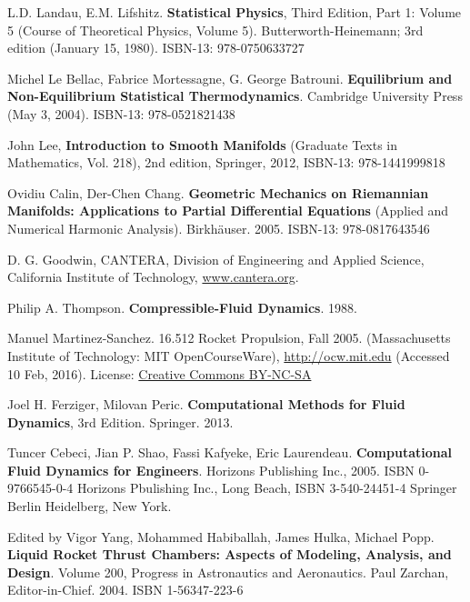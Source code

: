 \documentclass[10pt]{amsart}
\begin{document}
\begin{thebibliography}{9}
L.D. Landau, E.M. Lifshitz.  \textbf{Statistical Physics}, Third Edition, Part 1: Volume 5 (Course of Theoretical Physics, Volume 5). Butterworth-Heinemann; 3rd edition (January 15, 1980).  ISBN-13: 978-0750633727


Michel Le Bellac, Fabrice Mortessagne, G. George Batrouni.  \textbf{Equilibrium and Non-Equilibrium Statistical Thermodynamics}.  Cambridge University Press (May 3, 2004).  ISBN-13: 978-0521821438


John Lee, \textbf{Introduction to Smooth Manifolds} (Graduate Texts in Mathematics, Vol. 218), 2nd edition, Springer,  2012, ISBN-13: 978-1441999818

Ovidiu Calin, Der-Chen Chang. \textbf{Geometric Mechanics on Riemannian Manifolds: Applications to Partial Differential Equations} (Applied and Numerical Harmonic Analysis).  Birkh\"{a}user. 2005. ISBN-13: 978-0817643546




D. G. Goodwin, CANTERA, Division of Engineering and Applied Science, California Institute of Technology,
\url{www.cantera.org}.

Philip A. Thompson.  \textbf{Compressible-Fluid Dynamics}.  1988.

Manuel Martinez-Sanchez. 16.512 Rocket Propulsion, Fall 2005. (Massachusetts Institute of Technology: MIT OpenCourseWare), \href{http://ocw.mit.edu/courses/aeronautics-and-astronautics/16-512-rocket-propulsion-fall-2005}{http://ocw.mit.edu} (Accessed 10 Feb, 2016). License: \href{http://creativecommons.org/licenses/by-nc-sa/4.0/}{Creative Commons BY-NC-SA}


 Joel H. Ferziger, Milovan Peric.  \textbf{Computational Methods for Fluid Dynamics}, 3rd Edition.  Springer.  2013.  

 Tuncer Cebeci, Jian P. Shao, Fassi Kafyeke, Eric Laurendeau.  \textbf{Computational Fluid Dynamics for Engineers}.  Horizons Publishing Inc., 2005.  ISBN 0-9766545-0-4 Horizons Pbulishing Inc., Long Beach, ISBN 3-540-24451-4 Springer Berlin Heidelberg, New York.  
  


Edited by Vigor Yang, Mohammed Habiballah, James Hulka, Michael Popp.  \textbf{Liquid Rocket Thrust Chambers: Aspects of Modeling, Analysis, and Design}.  Volume 200, Progress in Astronautics and Aeronautics.  Paul Zarchan, Editor-in-Chief. 2004.  ISBN 1-56347-223-6


\end{thebibliography}
\end{document}
